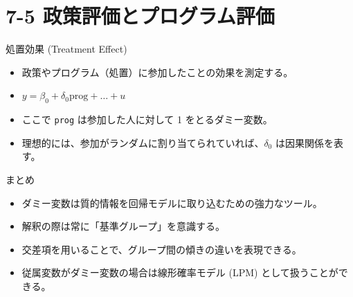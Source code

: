 \documentclass[
  ignorenonframetext,
]{beamer}
\providecommand{\tightlist}{%
  \setlength{\itemsep}{0pt}\setlength{\parskip}{0pt}}
\begin{document}
\hypertarget{ux653fux7b56ux8a55ux4fa1ux3068ux30d7ux30edux30b0ux30e9ux30e0ux8a55ux4fa1}{%
\section{7-5
政策評価とプログラム評価}\label{ux653fux7b56ux8a55ux4fa1ux3068ux30d7ux30edux30b0ux30e9ux30e0ux8a55ux4fa1}}

\begin{frame}[fragile]{処置効果 (Treatment Effect)}
\protect\hypertarget{ux51e6ux7f6eux52b9ux679c-treatment-effect}{}
\begin{itemize}
\tightlist
\item
  政策やプログラム（処置）に参加したことの効果を測定する。
\item
  \(y = \beta_0 + \delta_0 \text{prog} + \dots + u\)
\item
  ここで \texttt{prog} は参加した人に対して 1 をとるダミー変数。
\item
  理想的には、参加がランダムに割り当てられていれば、\(\delta_0\)
  は因果関係を表す。
\end{itemize}
\end{frame}

\begin{frame}{まとめ}
\protect\hypertarget{ux307eux3068ux3081}{}
\begin{itemize}
\tightlist
\item
  ダミー変数は質的情報を回帰モデルに取り込むための強力なツール。
\item
  解釈の際は常に「基準グループ」を意識する。
\item
  交差項を用いることで、グループ間の傾きの違いを表現できる。
\item
  従属変数がダミー変数の場合は線形確率モデル (LPM)
  として扱うことができる。
\end{itemize}
\end{frame}
\end{document}
